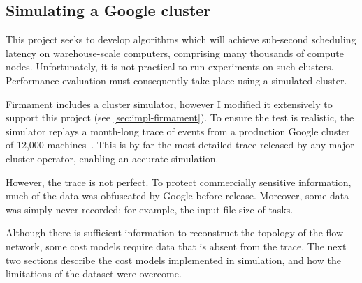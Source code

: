 
\subsection{Simulating a Google cluster}


This project seeks to develop algorithms which will achieve sub-second scheduling latency on warehouse-scale computers, comprising many thousands of compute nodes. Unfortunately, it is not practical to run experiments on such clusters. Performance evaluation must consequently take place using a simulated cluster\footnotemark.

Firmament includes a cluster simulator, however I modified it extensively to support this project (see \cref{sec:impl-firmament}). To ensure the test is realistic, the simulator replays a month-long trace of events from a production Google cluster of 12,000 machines~\cite{clusterdata:Wilkes2011,clusterdata:Reiss2011,Reiss:2012}. This is by far the most detailed trace released by any major cluster operator, enabling an accurate simulation.

However, the trace is not perfect. To protect commercially sensitive information, much of the data was obfuscated by Google before release. Moreover, some data was simply never recorded: for example, the input file size of tasks. 

Although there is sufficient information to reconstruct the topology of the flow network, some cost models require data that is absent from the trace. The next two sections describe the cost models implemented in simulation, and how the limitations of the dataset were overcome.



